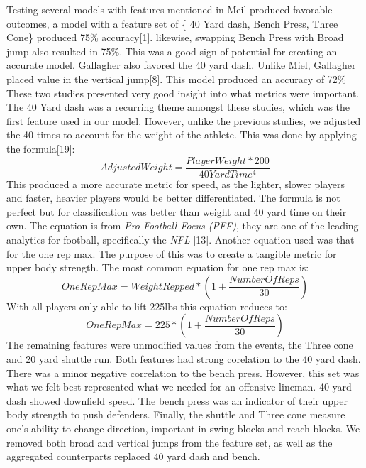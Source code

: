 \documentclass[confrence]{IEEEtran}
\begin{document}
Testing several models with features mentioned in Meil produced favorable outcomes, a model with a feature set of \{
40 Yard dash, Bench Press, Three Cone\} produced 75\% accuracy[1]. likewise, swapping Bench Press with Broad jump also resulted in 75\%.
This was a good sign of potential for creating an accurate model.
Gallagher also favored the 40 yard dash. Unlike Miel, Gallagher placed value in the vertical jump[8]. This model produced an accuracy of 72\%
These two studies presented very good insight into what metrics were important.
The 40 Yard dash was a recurring theme amongst these studies, which was the first feature used in our model.
However, unlike the previous studies, we adjusted the 40 times to account for the weight of the athlete. This was done by applying the formula[19]:
\[
    AdjustedWeight = \frac{PlayerWeight*200}{40YardTime^4}
\]
This produced a more accurate metric for speed, as the lighter, slower players and faster, heavier players would be better differentiated.
The formula is not perfect but for classification was better than weight and 40 yard time on their own.
The equation is from \textit{Pro Football Focus (PFF)}, they are one of the leading analytics for football, specifically the \textit{NFL} [13].
Another equation used was that for the one rep max. The purpose of this was to create a tangible metric for upper body strength.
The most common equation for one rep max is:
\[
    OneRepMax = WeightRepped*(1+\frac{NumberOfReps}{30})
\]
With all players only able to lift 225lbs this equation reduces to:
\[
    OneRepMax = 225*(1+\frac{NumberOfReps}{30})
\]
The remaining features were unmodified values from the events, the Three cone and 20 yard shuttle run.
Both features had strong corelation to the 40 yard dash. There was a minor negative correlation to the bench press.
However, this set was what we felt best represented what we needed for an offensive lineman.
40 yard dash showed downfield speed. The bench press was an indicator of their upper body strength to push defenders. Finally, the shuttle and Three cone measure one's ability to change direction, important in swing blocks and reach blocks.
We removed both broad and vertical jumps from the feature set, as well as the aggregated counterparts replaced 40 yard dash and bench.
\end{document}
